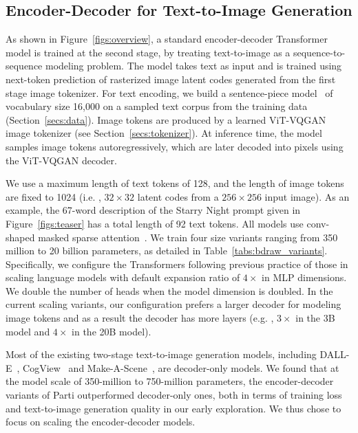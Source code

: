 \subsection{Encoder-Decoder for Text-to-Image Generation}

As shown in Figure~\ref{figs:overview}, a standard encoder-decoder Transformer model is trained at the second stage, by treating text-to-image as a sequence-to-sequence modeling problem. The model takes text as input and is trained using next-token prediction of rasterized image latent codes generated from the first stage image tokenizer. For text encoding, we build a sentence-piece model~\cite{sennrich2015neural, kudo2018sentencepiece} of vocabulary size 16,000 on a sampled text corpus from the training data (Section~\ref{secs:data}). Image tokens are produced by a learned ViT-VQGAN image tokenizer (see Section~\ref{secs:tokenizer}). At inference time, the model samples image tokens autoregressively, which are later decoded into pixels using the ViT-VQGAN decoder.

We use a maximum length of text tokens of 128, and the length of image tokens are fixed to 1024 (i.e. , \(32{\times}32\) latent codes from a \(256\times256\) input image). As an example, the 67-word description of the Starry Night prompt given in Figure~\ref{figs:teaser} has a total length of 92 text tokens. All models use conv-shaped masked sparse attention~\cite{child2019generating}. We train four size variants ranging from 350 million to 20 billion parameters, as detailed in Table~\ref{tabs:bdraw_variants}. Specifically, we configure the Transformers following previous practice of those in scaling language models with default expansion ratio of \(4\times\) in MLP dimensions. We double the number of heads when the model dimension is doubled. In the current scaling variants, our configuration prefers a larger decoder for modeling image tokens and as a result the decoder has more layers (e.g. , \(3\times\) in the 3B model and \(4\times\) in the 20B model).

Most of the existing two-stage text-to-image generation models, including DALL-E~\cite{ramesh2021zero}, CogView~\cite{ding2021cogview} and Make-A-Scene~\cite{gafni2022make}, are decoder-only models. We found that at the model scale of 350-million to 750-million parameters, the encoder-decoder variants of Parti outperformed decoder-only ones, both in terms of training loss and text-to-image generation quality in our early exploration. We thus chose to focus on scaling the encoder-decoder models.


